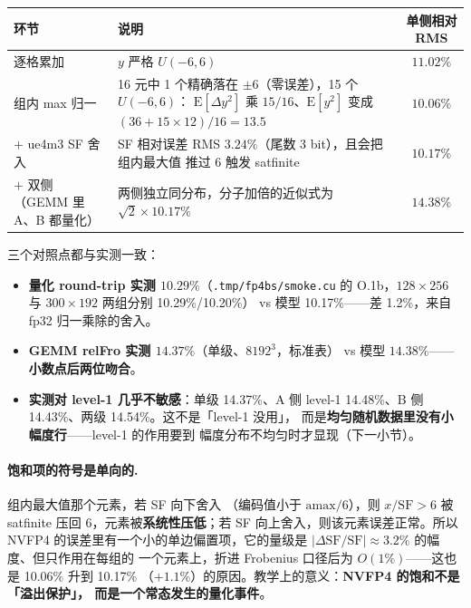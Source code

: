 \begin{center}
\footnotesize
\begin{tabular}{@{}p{2.5cm}p{7.6cm}c@{}}
\toprule
环节 & 说明 & 单侧相对 RMS \\
\midrule
逐格累加 & $y$ 严格 $U(-6,6)$ & $11.02\%$ \\
组内 max 归一 & 16 元中 1 个精确落在 $\pm6$（零误差），15 个 $U(-6,6)$：
  $\mathrm{E}[\Delta y^2]$ 乘 $15/16$、$\mathrm{E}[y^2]$ 变成
  $(36+15\times12)/16=13.5$ & $10.06\%$ \\
$+$ ue4m3 SF 舍入 & SF 相对误差 RMS $3.24\%$（尾数 3 bit），且会把组内最大值
  推过 $6$ 触发 satfinite & $10.17\%$ \\
\midrule
$+$ 双侧（GEMM 里 A、B 都量化） & 两侧独立同分布，分子加倍的近似式为
  $\sqrt{2}\times 10.17\%$ & $\mathbf{14.38\%}$ \\
\bottomrule
\end{tabular}
\end{center}

三个对照点都与实测一致：

\begin{itemize}[itemsep=2pt,topsep=3pt]
  \item \textbf{量化 round-trip 实测 $10.29\%$}（\texttt{.tmp/fp4bs/smoke.cu}
        的 O.1b，$128\times256$ 与 $300\times192$ 两组分别 10.29\%/10.20\%）
        vs 模型 10.17\%——差 1.2\%，来自 fp32 归一乘除的舍入。
  \item \textbf{GEMM relFro 实测 $14.37\%$}（单级、$8192^3$，标准表）
        vs 模型 $14.38\%$——\textbf{小数点后两位吻合}。
  \item \textbf{实测对 level-1 几乎不敏感}：单级 14.37\%、A 侧 level-1
        14.48\%、B 侧 14.43\%、两级 14.54\%。这不是「level-1 没用」，
        而是\textbf{均匀随机数据里没有小幅度行}——level-1 的作用要到
        幅度分布不均匀时才显现（下一小节）。
\end{itemize}

\paragraph{饱和项的符号是单向的.} 组内最大值那个元素，若 SF 向下舍入
（编码值小于 $\mathrm{amax}/6$），则 $x/\mathrm{SF} > 6$ 被 satfinite 压回
$6$，元素被\textbf{系统性压低}；若 SF 向上舍入，则该元素误差正常。所以
NVFP4 的误差里有一个小的单边偏置项，它的量级是
$|\Delta \mathrm{SF}/\mathrm{SF}| \approx 3.2\%$ 的幅度、但只作用在每组的
一个元素上，折进 Frobenius 口径后为 $O(1\%)$——这也是 10.06\% 升到 10.17\%
（$+1.1\%$）的原因。教学上的意义：\textbf{NVFP4 的饱和不是「溢出保护」，
而是一个常态发生的量化事件}。

